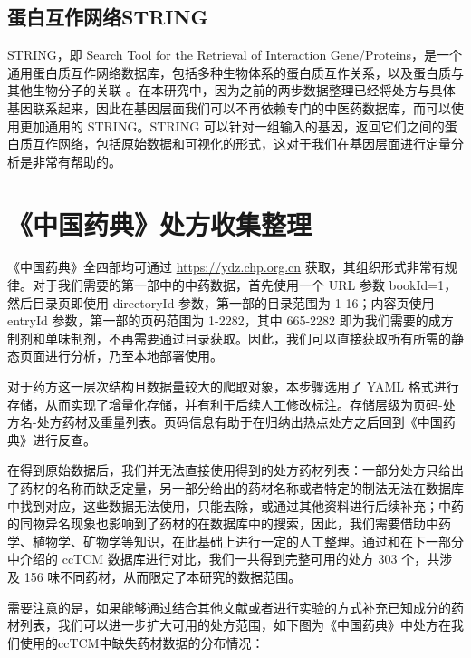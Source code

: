 \subsection{蛋白互作网络STRING}

STRING，即 Search Tool for the Retrieval of Interaction Gene/Proteins，是一个通用蛋白质互作网络数据库，包括多种生物体系的蛋白质互作关系，以及蛋白质与其他生物分子的关联\cite{Szklarczyk_Gable_Nastou_Lyon_Kirsch_Pyysalo_Doncheva_Legeay_Fang_Bork_et_al._2021} 。在本研究中，因为之前的两步数据整理已经将处方与具体基因联系起来，因此在基因层面我们可以不再依赖专门的中医药数据库，而可以使用更加通用的 STRING。STRING 可以针对一组输入的基因，返回它们之间的蛋白质互作网络，包括原始数据和可视化的形式，这对于我们在基因层面进行定量分析是非常有帮助的。

\section{《中国药典》处方收集整理}

《中国药典》全四部均可通过 \url{https://ydz.chp.org.cn} 获取，其组织形式非常有规律\cite{中华人民共和国药典_2023}。对于我们需要的第一部中的中药数据，首先使用一个 URL 参数 {bookId=1}，然后目录页即使用 {directoryId} 参数，第一部的目录范围为 1-16；内容页使用 {entryId} 参数，第一部的页码范围为 1-2282，其中 665-2282 即为我们需要的成方制剂和单味制剂，不再需要通过目录获取。因此，我们可以直接获取所有所需的静态页面进行分析，乃至本地部署使用。

对于药方这一层次结构且数据量较大的爬取对象，本步骤选用了 YAML 格式进行存储，从而实现了增量化存储，并有利于后续人工修改标注。存储层级为页码-处方名-处方药材及重量列表。页码信息有助于在归纳出热点处方之后回到《中国药典》进行反查。

在得到原始数据后，我们并无法直接使用得到的处方药材列表：一部分处方只给出了药材的名称而缺乏定量，另一部分给出的药材名称或者特定的制法无法在数据库中找到对应，这些数据无法使用，只能去除，或通过其他资料进行后续补充；中药的同物异名现象也影响到了药材的在数据库中的搜索，因此，我们需要借助中药学、植物学、矿物学等知识，在此基础上进行一定的人工整理。通过和在下一部分中介绍的 ccTCM 数据库进行对比，我们一共得到完整可用的处方 303 个，共涉及 156 味不同药材，从而限定了本研究的数据范围。

需要注意的是，如果能够通过结合其他文献或者进行实验的方式补充已知成分的药材列表，我们可以进一步扩大可用的处方范围，如下图为《中国药典》中处方在我们使用的ccTCM中缺失药材数据的分布情况：

